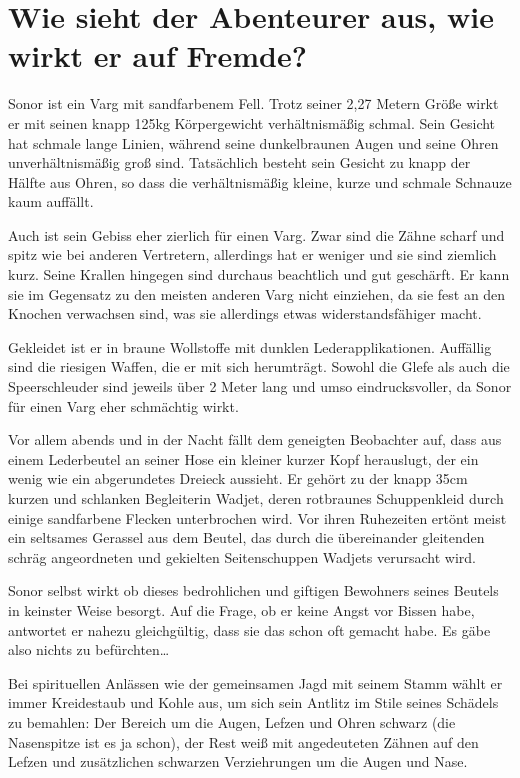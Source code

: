 	\section[Aussehen]{Wie sieht der Abenteurer aus, wie wirkt er auf Fremde?}
	
	Sonor ist ein Varg mit sandfarbenem Fell. Trotz
	seiner 2,27 Metern Größe wirkt er mit seinen knapp 125kg Körpergewicht
	verhältnismäßig schmal. Sein Gesicht hat schmale lange Linien, während
	seine dunkelbraunen Augen und seine Ohren unverhältnismäßig groß sind.
	Tatsächlich besteht sein Gesicht zu knapp der Hälfte aus Ohren, so dass
	die verhältnismäßig kleine, kurze und schmale Schnauze kaum auffällt.

	Auch ist sein Gebiss eher zierlich für einen Varg. Zwar sind die Zähne
	scharf und spitz wie bei anderen Vertretern, allerdings hat er
	weniger und sie sind ziemlich kurz.
	Seine Krallen hingegen sind durchaus beachtlich und gut geschärft. Er
	kann sie im Gegensatz zu den meisten anderen Varg nicht einziehen, da
	sie fest an den Knochen verwachsen sind, was sie allerdings
	etwas widerstandsfähiger macht.

	Gekleidet ist er in braune Wollstoffe mit dunklen Lederapplikationen.
	Auffällig sind die riesigen Waffen, die er mit sich herumträgt. Sowohl
	die Glefe als auch die Speerschleuder sind jeweils über 2 Meter lang und
	umso eindrucksvoller, da Sonor für einen Varg eher schmächtig wirkt.

	Vor allem abends und in der Nacht fällt dem geneigten Beobachter auf,
	dass aus einem Lederbeutel an seiner Hose ein kleiner kurzer
	Kopf herauslugt, der ein wenig wie ein abgerundetes Dreieck aussieht.
	Er gehört zu der knapp 35cm kurzen und schlanken Begleiterin Wadjet,
	deren rotbraunes Schuppenkleid durch einige sandfarbene Flecken
	unterbrochen wird.
	Vor ihren Ruhezeiten ertönt meist ein seltsames Gerassel aus dem
	Beutel, das durch die übereinander gleitenden schräg angeordneten und
	gekielten Seitenschuppen Wadjets verursacht wird.

	Sonor selbst wirkt ob dieses bedrohlichen und giftigen Bewohners seines
	Beutels in keinster Weise besorgt. Auf die Frage, ob er keine Angst vor
	Bissen habe, antwortet er nahezu gleichgültig, dass sie das schon oft
	gemacht habe. Es gäbe also nichts zu befürchten\ldots

	Bei spirituellen Anlässen wie der gemeinsamen Jagd mit seinem Stamm
	wählt er immer Kreidestaub und Kohle aus, um sich sein Antlitz im Stile
	seines Schädels zu bemahlen: Der Bereich um die Augen, Lefzen und Ohren schwarz
	(die Nasenspitze ist es ja schon), der Rest weiß mit angedeuteten Zähnen
	auf den Lefzen und zusätzlichen schwarzen Verziehrungen um die Augen und
	Nase.
	
